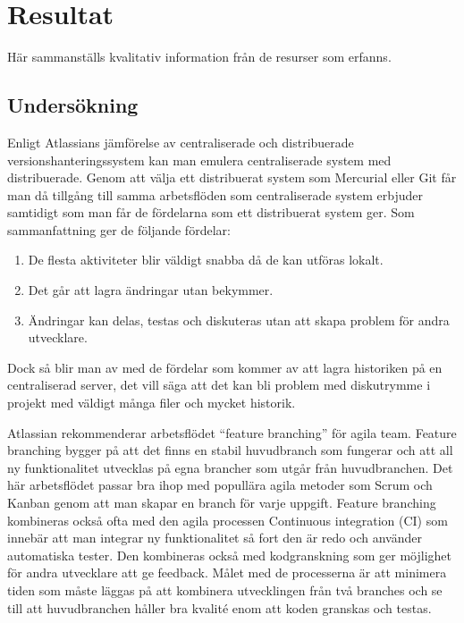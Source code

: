 \section{Resultat}
\label{sec:bjorn-results}
Här sammanställs kvalitativ information från de resurser som erfanns.


\subsection{Undersökning}
Enligt Atlassians jämförelse av centraliserade och distribuerade versionshanteringssystem kan man emulera centraliserade system med distribuerade. Genom att välja ett distribuerat system som Mercurial eller Git får man då tillgång till samma arbetsflöden som centraliserade system erbjuder samtidigt som man får de fördelarna som ett distribuerat system ger. Som sammanfattning ger de följande fördelar:
\begin{enumerate}
\item De flesta aktiviteter blir väldigt snabba då de kan utföras lokalt.
\item Det går att lagra ändringar utan bekymmer.
\item Ändringar kan delas, testas och diskuteras utan att skapa problem för andra utvecklare.
\end{enumerate}
Dock så blir man av med de fördelar som kommer av att lagra historiken på en centraliserad server, det vill säga att det kan bli problem med diskutrymme i projekt med väldigt många filer och mycket historik.\cite{central-vs-distributed}

Atlassian rekommenderar arbetsflödet ``feature branching'' för agila team. Feature branching bygger på att det finns en stabil huvudbranch som fungerar och att all ny funktionalitet utvecklas på egna brancher som utgår från huvudbranchen. Det här arbetsflödet passar bra ihop med popullära agila metoder som Scrum och Kanban genom att man skapar en branch för varje uppgift. Feature branching kombineras också ofta med den agila processen Continuous integration (CI) som innebär att man integrar ny funktionalitet så fort den är redo och använder automatiska tester. Den kombineras också med kodgranskning som ger möjlighet för andra utvecklare att ge feedback. Målet med de processerna är att minimera tiden som måste läggas på att kombinera utvecklingen från två branches och se till att huvudbranchen håller bra kvalité enom att koden granskas och testas.\cite{daly-agile-git, radigan-feature-branch, atlassian-feature-branch}

